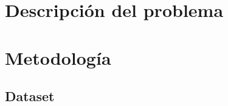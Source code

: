 \documentclass{article}
\begin{document}

\section{Descripción del problema}


\section{Metodología}

\subsection{Dataset}

\end{document}
